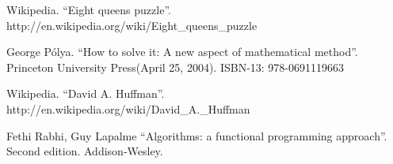 \documentclass[UTF8]{article}
\begin{document}
\begin{thebibliography}{99}
Wikipedia. ``Eight queens puzzle''. http://en.wikipedia.org/wiki/Eight\_queens\_puzzle

George P\'{o}lya. ``How to solve it: A new aspect of mathematical method''. Princeton University Press(April 25, 2004). ISBN-13: 978-0691119663

Wikipedia. ``David A. Huffman''. http://en.wikipedia.org/wiki/David\_A.\_Huffman

Fethi Rabhi, Guy Lapalme ``Algorithms: a functional programming approach''. Second edition. Addison-Wesley.

\end{thebibliography}

\ifx\wholebook\relax\else
\end{document}
